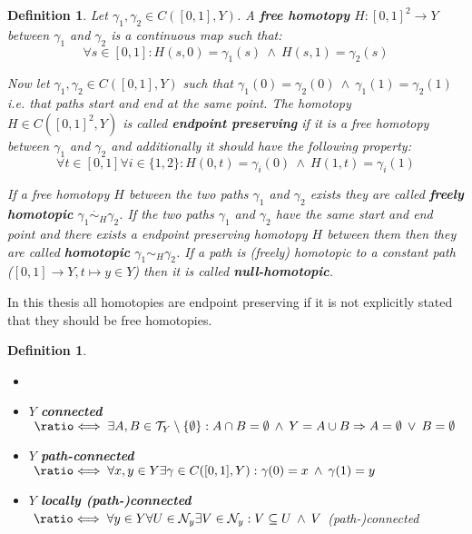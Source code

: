 \documentclass{article}
\newcommand{\T}[0]{\mathcal{T}}
\newcommand{\NB}[0]{\mathcal{N}}
\newcommand*{\longeq}{\ratio\Longleftrightarrow}
\theoremstyle{break}
\theoremstyle{break}
\newtheorem{defin}[thm]{Definition}
\begin{document}
\begin{defin}
  Let $\gamma_1, \gamma_2 \in C([0, 1], Y)$. A \textbf{free homotopy} $H: [0,1]^2 \to Y$ between $\gamma_1$ and $\gamma_2$ is a continuous map such that:
  \begin{equation*}
    \forall s \in [0,1]: H(s, 0) = \gamma_1(s) \: \land \: H(s, 1) = \gamma_2(s)
  \end{equation*}

  Now let $\gamma_1, \gamma_2 \in C([0, 1], Y)$ such that $\gamma_1(0) = \gamma_2(0) \: \land \: \gamma_1(1) = \gamma_2(1)$ i.e. that paths start and end at the same point.
  The homotopy $H \in C([0,1]^2, Y)$ is called \textbf{endpoint preserving} if it is a free homotopy between $\gamma_1$ and $\gamma_2$ and additionally it should have the following property: 
  \begin{equation*}
    \forall t\in[0,1]\forall i\in \{1,2\}: H(0, t) = \gamma_i(0) \: \land \: H(1, t) = \gamma_i(1)
  \end{equation*}

  If a free homotopy $H$ between the two paths $\gamma_1$ and $\gamma_2$ exists they are called \textbf{freely homotopic} $\gamma_1 \overset{\cdot}{\sim}_H \gamma_2$.
  If the two paths $\gamma_1$ and $\gamma_2$ have the same start and end point and there exists a endpoint preserving homotopy $H$ between them then they are called 
  \textbf{homotopic} $\gamma_1 \sim_H \gamma_2$. If a path is (freely) homotopic to a constant path ($[0,1] \to Y, t \mapsto y \in Y$) then it is called \textbf{null-homotopic}.
\end{defin}

In this thesis all homotopies are endpoint preserving if it is not explicitly stated that they should be free homotopies.

\begin{defin} \label{def:connectedness}
  \begin{itemize}
    \item[] %
    \item $Y$ \textbf{connected} $\;\longeq\; \exists A,B \in \T_Y\setminus \{\emptyset\}: A \cap B = \emptyset \: \land \: Y = A \cup B \Rightarrow A = \emptyset \: \lor \: B = \emptyset$
    \item $Y$ \textbf{path-connected} $\;\longeq\; \forall x,y \in Y \exists\gamma \in C([0,1], Y): \gamma(0) = x \: \land \: \gamma(1) = y$
    \item $Y$ \textbf{locally (path-)connected} $\;\longeq\; \forall y \in Y\forall U \in \NB_y\exists V\in \NB_y: V \subseteq U \: \land \: V$ (path-)connected
  \end{itemize}
\end{defin}
\end{document}
